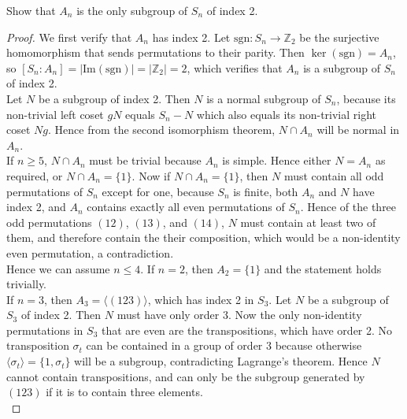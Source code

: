 Show that $A_n$ is the only subgroup of $S_n$ of index 2.
\begin{proof}
  We first verify that $A_n$ has index 2. Let
  $\text{sgn}:S_n\rightarrow\mathbb{Z}_2$ be the surjective homomorphism
  that sends permutations to their parity. Then $\ker(\text{sgn})=A_n$,
  so $[S_n:A_n]=|\text{Im}(\text{sgn})|=|\mathbb{Z}_2|=2$, which
  verifies that $A_n$ is a subgroup of $S_n$ of index 2. \\

  Let $N$ be a subgroup of index 2. Then $N$ is a normal subgroup of
  $S_n$, because its non-trivial left coset $gN$ equals $S_n-N$ which
  also equals its non-trivial right coset $Ng$. Hence from the second
  isomorphism theorem, $N\cap A_n$ will be normal in $A_n$. \\

  If $n\geq 5$, $N\cap A_n$ must be trivial because $A_n$ is simple.
  Hence either $N=A_n$ as required, or $N\cap A_n=\{1\}$. Now if $N\cap
  A_n=\{1\}$, then $N$ must contain all odd permutations of $S_n$ except
  for one, because $S_n$ is finite, both $A_n$ and $N$ have index 2, and
  $A_n$ contains exactly all even permutations of $S_n$. Hence of the
  three odd permutations $(12)$, $(13)$, and $(14)$, $N$ must contain
  at least two of them, and therefore contain the their composition,
  which would be a non-identity even permutation, a contradiction. \\

  Hence we can assume $n\leq4$. If $n=2$, then $A_2=\{1\}$ and the
  statement holds trivially. \\

  If $n=3$, then $A_3=\langle(123)\rangle$, which has index 2 in $S_3$.
  Let $N$ be a subgroup of $S_3$ of index 2. Then $N$ must have only
  order 3. Now the only non-identity permutations in $S_3$ that are even
  are the transpositions, which have order 2. No transposition
  $\sigma_t$ can be contained in a group of order 3 because otherwise
  $\langle\sigma_t\rangle=\{1,\sigma_t\}$ will be a subgroup,
  contradicting Lagrange's theorem. Hence $N$ cannot contain
  transpositions, and can only be the subgroup generated by $(123)$ if
  it is to contain three elements. \\


\end{proof}
